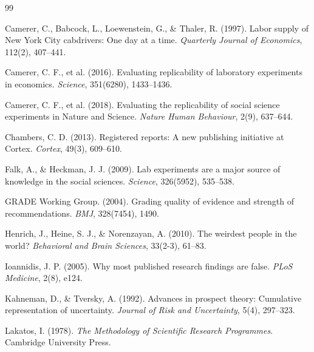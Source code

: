 \documentclass[11pt,a4paper]{article}
\begin{document}



\begin{thebibliography}{99}

Camerer, C., Babcock, L., Loewenstein, G., \& Thaler, R. (1997).
Labor supply of New York City cabdrivers: One day at a time.
\textit{Quarterly Journal of Economics}, 112(2), 407--441.

Camerer, C. F., et al. (2016).
Evaluating replicability of laboratory experiments in economics.
\textit{Science}, 351(6280), 1433--1436.

Camerer, C. F., et al. (2018).
Evaluating the replicability of social science experiments in Nature and Science.
\textit{Nature Human Behaviour}, 2(9), 637--644.

Chambers, C. D. (2013).
Registered reports: A new publishing initiative at Cortex.
\textit{Cortex}, 49(3), 609--610.

Falk, A., \& Heckman, J. J. (2009).
Lab experiments are a major source of knowledge in the social sciences.
\textit{Science}, 326(5952), 535--538.

GRADE Working Group. (2004).
Grading quality of evidence and strength of recommendations.
\textit{BMJ}, 328(7454), 1490.

Henrich, J., Heine, S. J., \& Norenzayan, A. (2010).
The weirdest people in the world?
\textit{Behavioral and Brain Sciences}, 33(2-3), 61--83.

Ioannidis, J. P. (2005).
Why most published research findings are false.
\textit{PLoS Medicine}, 2(8), e124.

Kahneman, D., \& Tversky, A. (1992).
Advances in prospect theory: Cumulative representation of uncertainty.
\textit{Journal of Risk and Uncertainty}, 5(4), 297--323.

Lakatos, I. (1978).
\textit{The Methodology of Scientific Research Programmes}.
Cambridge University Press.


\end{thebibliography}
\end{document}
